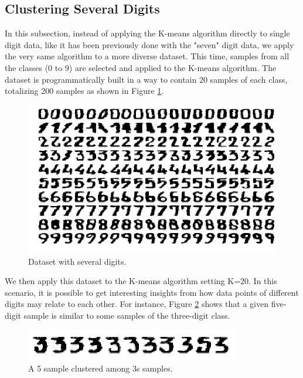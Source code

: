 \documentclass{article}
\begin{document}
\subsection{Clustering Several Digits}

In this subsection, instead of applying the K-means algorithm directly to single digit data, like it has been previously done with the "seven" digit data, we apply the very same algorithm to a more diverse dataset. This time, samples from all the classes (0 to 9) are selected and applied to the K-means algorithm. The dataset is programmatically built in a way to contain 20 samples of each class, totalizing 200 samples as shown in Figure \ref{fig:several_dataset}.

\begin{figure}[h!]
    \centering
    \includegraphics[width=\textwidth]{images/dataset_several_digits.png}
    \caption{Dataset with several digits.}
    \label{fig:several_dataset}
\end{figure}

We then apply this dataset to the K-means algorithm setting K=20. In this scenario, it is possible to get interesting insights from how data points of different digits may relate to each other. For instance, Figure \ref{fig:5_among_3} shows that a given five-digit sample is similar to some samples of the three-digit class.

\begin{figure}[h!]
    \centering
    \includegraphics[width=\textwidth]{images/5_among_3s.png}
    \caption{A 5 sample clustered among 3s samples.}
    \label{fig:5_among_3}
\end{figure}
\end{document}
